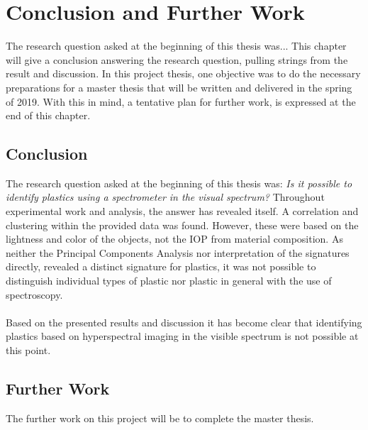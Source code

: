 \chapter{Conclusion and Further Work}
\label{chap:conclusion}
The research question asked at the beginning of this thesis was... This chapter will give a conclusion answering the research question, pulling strings from the result and discussion. In this project thesis, one objective was to do the necessary preparations for a master thesis that will be written and delivered in the spring of 2019. With this in mind, a tentative plan for further work, is expressed at the end of this chapter. 


\section{Conclusion}
The research question asked at the beginning of this thesis was: \textit{Is it possible to identify plastics using a spectrometer in the visual spectrum?} Throughout experimental work and analysis, the answer has revealed itself. A correlation and clustering within the provided data was found. However, these were based on the lightness and color of the objects, not the IOP from material composition. As neither the Principal Components Analysis nor interpretation of the signatures directly, revealed a distinct signature for plastics, it was not possible to distinguish individual types of plastic nor plastic in general with the use of spectroscopy.
\\\\
Based on the presented results and discussion it has become clear that identifying plastics based on hyperspectral imaging in the visible spectrum is not possible at this point. 

\section{Further Work}
The further work on this project will be to complete the master thesis. 
